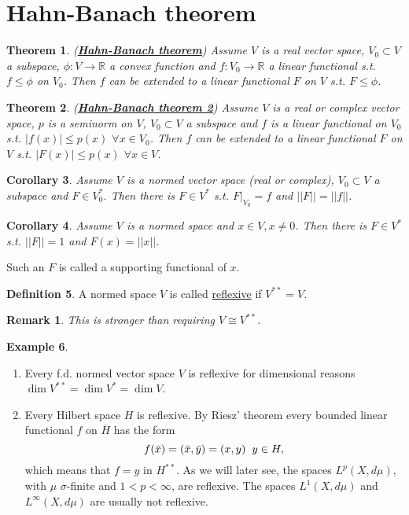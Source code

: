 \documentclass{article}
\newtheorem{theorem}{Theorem}[section]
\newtheorem{corollary}[theorem]{Corollary}
\newtheorem*{remark}{Remark}
\theoremstyle{definition}
\newtheorem{definition}[theorem]{Definition}
\newtheorem{example}[theorem]{Example}
\newcommand{\R}{\mathbb{R}}
\newcommand{\tmm}{\hspace{2mm}}
\begin{document}
\section{Hahn-Banach theorem}

\begin{theorem}(\underline{\textbf{Hahn-Banach theorem}})
    Assume $V$ is a real vector space, $V_0\subset V$ a subspace, $\phi:V\rightarrow \R$ a convex function and $f:V_0\rightarrow \R$ a linear functional
     s.t. $f\leq \phi$ on $V_0$. Then $f$ can be extended to a linear functional $F$ on $V$ s.t. $F\leq\phi$.
    
\end{theorem}

\begin{theorem}(\underline{\textbf{Hahn-Banach theorem 2}})
    Assume $V$ is a real or complex vector space, $p$ is a seminorm on $V$, $V_0\subset V$ a subspace and $f$ is a linear
    functional on $V_0$ s.t. $|f(x)|\leq p(x)$ $\forall x\in V_0$. Then $f$ can be extended to a linear functional $F$ on $V$ s.t.
    $|F(x)|\leq p(x)$ $\forall x\in V$.
\end{theorem}

\begin{corollary}
    Assume $V$ is a normed vector space (real or complex), $V_0\subset V$ a subspace and $F\in V_0^*$. Then there is $F\in V^*$ s.t.
    $\left.F\right|_{V_0}=f$ and $||F||=||f||$.
\end{corollary}

\begin{corollary}
    Assume $V$ is a normed space and $x\in V, x\neq 0$. Then there is $F\in V^*$ s.t. $||F||=1$ and $F(x) = ||x||$.
\end{corollary}
Such an $F$ is called a supporting functional of $x$.

\begin{definition}
    A normed space $V$ is called \underline{reflexive} if $V^{**}=V$.
\end{definition}
\begin{remark}
    This is stronger than requiring $V\cong V^{**}$.
\end{remark}
\begin{example}
    \begin{enumerate}
        \item Every f.d. normed vector space $V$ is reflexive for dimensional reasons $\dim V^{**} = \dim V^* = \dim V$.
        \item Every Hilbert space $H$ is reflexive. By Riesz' theorem every bounded linear functional $f$ on $\overline H$ has the form
        $$f(\bar x) = (\bar x,\bar y)=(x,y)\tmm y\in H,$$
        which means that $f=y$ in $H^{**}$. As we will later see, the spaces $L^p(X,d\mu)$, with $\mu$ $\sigma$-finite and $1<p<\infty$, are reflexive. The
        spaces $L^1(X,d\mu)$ and $L^\infty(X,d\mu)$ are usually not reflexive.
    \end{enumerate}
\end{example}
\end{document}
